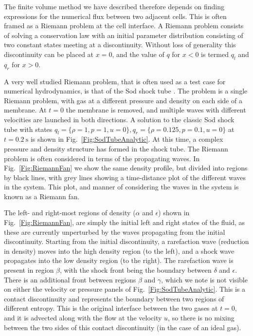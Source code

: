 The finite volume method we have described therefore depends on finding expressions for the numerical flux between two adjacent cells.
This is often framed as a Riemann problem at the cell interface.
A Riemann problem consists of solving a conservation law with an initial parameter distribution consisting of two constant states meeting at a discontinuity.
Without loss of generality this discontinuity can be placed at $x=0$, and the value of $q$ for $x<0$ is termed $q_l$ and $q_r$ for $x>0$.

A very well studied Riemann problem, that is often used as a test case for numerical hydrodynamics, is that of the Sod shock tube \citep{Sod1978}.
The problem is a single Riemann problem, with gas at a different pressure and density on each side of a membrane.
At $t=0$ the membrane is removed, and multiple waves with different velocities are launched in both directions.
A solution to the classic Sod shock tube with states $q_l = \{\rho=1, p=1, u=0\}, q_r = \{\rho=0.125, p=0.1, u=0\}$ at $t=\SI{0.2}{\second}$ is shown in Fig.~\ref{Fig:SodTubeAnalytic}.
At this time, a complex pressure and density structure has formed in the shock tube.
The Riemann problem is often considered in terms of the propagating waves.
In Fig.~\ref{Fig:RiemannFan} we show the same density profile, but divided into regions by black lines, with grey lines showing a time-distance plot of the different waves in the system.
This plot, and manner of considering the waves in the system is known as a Riemann fan.

The left- and right-most regions of density ($\alpha$ and $\epsilon$) shown in Fig.~\ref{Fig:RiemannFan}, are simply the initial left and right states of the fluid, as these are currently unperturbed by the waves propagating from the initial discontinuity.
Starting from the initial discontinuity, a rarefaction wave (reduction in density) moves into the high density region (to the left), and a shock wave propagates into the low density region (to the right).
The rarefaction wave is present in region $\beta$, with the shock front being the boundary between $\delta$ and $\epsilon$.
There is an additional front between regions $\beta$ and $\gamma$, which we note is not visible on either the velocity or pressure panels of Fig.~\ref{Fig:SodTubeAnalytic}.
This is a contact discontinuity and represents the boundary between two regions of different entropy.
This is the original interface between the two gases at $t=0$, and it is advected along with the flow at the velocity $u$, so there is no mixing between the two sides of this contact discontinuity (in the case of an ideal gas).


